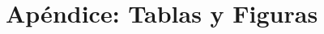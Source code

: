 \documentclass[12pt,a4paper,onecolumn]{article}
\begin{document}

\pagebreak

\appendix
\renewcommand{\theequation}{\Alph{chapter}.\arabic{equation}}

\setcounter{figure}{0}
\setcounter{table}{0}
\makeatletter 
\renewcommand{\thefigure}{A.\@arabic\c@figure}
\renewcommand{\thetable}{A.\@arabic\c@table}

\section{Apéndice: Tablas y Figuras}\label{sec:appendix_tables} 
\end{document}
